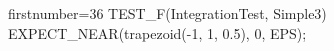 \begin{cppcode*}{firstnumber=36}
TEST_F(IntegrationTest, Simple3) {
    EXPECT_NEAR(trapezoid(-1, 1, 0.5), 0, EPS);
}
\end{cppcode*}
